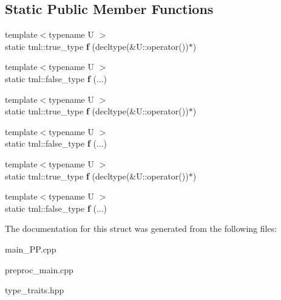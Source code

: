 \subsection*{Static Public Member Functions}
\begin{DoxyCompactItemize}
\item 
\hypertarget{structtml_1_1impl_1_1is__functor_a3a60ed6b4c16e7f0c52f33fae15b1c30}{{\footnotesize template$<$typename U $>$ }\\static tml\+::true\+\_\+type {\bfseries f} (decltype(\&U\+::operator())$\ast$)}\label{structtml_1_1impl_1_1is__functor_a3a60ed6b4c16e7f0c52f33fae15b1c30}

\item 
\hypertarget{structtml_1_1impl_1_1is__functor_a7cf6266da53af192cbcc74dc84063901}{{\footnotesize template$<$typename U $>$ }\\static tml\+::false\+\_\+type {\bfseries f} (...)}\label{structtml_1_1impl_1_1is__functor_a7cf6266da53af192cbcc74dc84063901}

\item 
\hypertarget{structtml_1_1impl_1_1is__functor_a3a60ed6b4c16e7f0c52f33fae15b1c30}{{\footnotesize template$<$typename U $>$ }\\static tml\+::true\+\_\+type {\bfseries f} (decltype(\&U\+::operator())$\ast$)}\label{structtml_1_1impl_1_1is__functor_a3a60ed6b4c16e7f0c52f33fae15b1c30}

\item 
\hypertarget{structtml_1_1impl_1_1is__functor_a7cf6266da53af192cbcc74dc84063901}{{\footnotesize template$<$typename U $>$ }\\static tml\+::false\+\_\+type {\bfseries f} (...)}\label{structtml_1_1impl_1_1is__functor_a7cf6266da53af192cbcc74dc84063901}

\item 
\hypertarget{structtml_1_1impl_1_1is__functor_a3a60ed6b4c16e7f0c52f33fae15b1c30}{{\footnotesize template$<$typename U $>$ }\\static tml\+::true\+\_\+type {\bfseries f} (decltype(\&U\+::operator())$\ast$)}\label{structtml_1_1impl_1_1is__functor_a3a60ed6b4c16e7f0c52f33fae15b1c30}

\item 
\hypertarget{structtml_1_1impl_1_1is__functor_a7cf6266da53af192cbcc74dc84063901}{{\footnotesize template$<$typename U $>$ }\\static tml\+::false\+\_\+type {\bfseries f} (...)}\label{structtml_1_1impl_1_1is__functor_a7cf6266da53af192cbcc74dc84063901}

\end{DoxyCompactItemize}


The documentation for this struct was generated from the following files\+:\begin{DoxyCompactItemize}
\item 
main\+\_\+\+P\+P.\+cpp\item 
preproc\+\_\+main.\+cpp\item 
type\+\_\+traits.\+hpp\end{DoxyCompactItemize}
